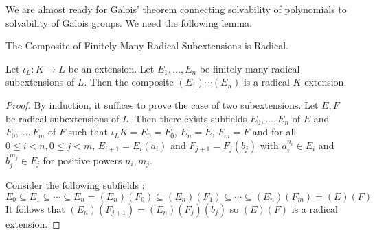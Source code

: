 \documentclass[../book.tex]{subfiles}
\begin{document}
We are almost ready for Galois' theorem connecting solvability of polynomials
to solvability of Galois groups.
We need the following lemma.
\begin{lem} The Composite of Finitely Many Radical Subextensions is Radical.
    
    Let $\iota_L : K \to L$ be an extension.
    Let $E_1,\dots,E_n$ be finitely many radical subextensions of $L$.
    Then the composite $(E_1)\cdots(E_n)$ is a radical $K$-extension.
    
\end{lem}
\begin{proof}
    
    By induction, it suffices to prove the case of two subextensions.
    Let $E, F$ be radical subextensions of $L$.
    Then there exists subfields $E_0,\dots,E_n$ of $E$ and $F_0,\dots,F_m$ of $F$
    such that $\iota_L K = E_0 = F_0$, $E_n = E$, $F_m = F$ and
    for all $0\leq i < n, 0\leq j < m$, $E_{i+1} = E_i(a_i)$ and $F_{j+1} = F_j(b_j)$
    with $a_i^{n_i} \in E_i$ and $b_j^{m_j} \in F_j$ for positive powers $n_i, m_j$.
    
    Consider the following subfields : \[
        E_0 \subseteq E_1 \subseteq \cdots \subseteq E_n = (E_n)(F_0) 
        \subseteq (E_n)(F_1) \subseteq \cdots \subseteq (E_n)(F_m) = (E)(F)
    \]
    It follows that $(E_n)(F_{j+1}) = (E_n)(F_j)(b_j)$
    so $(E)(F)$ is a radical extension. 
    
\end{proof}
\end{document}
